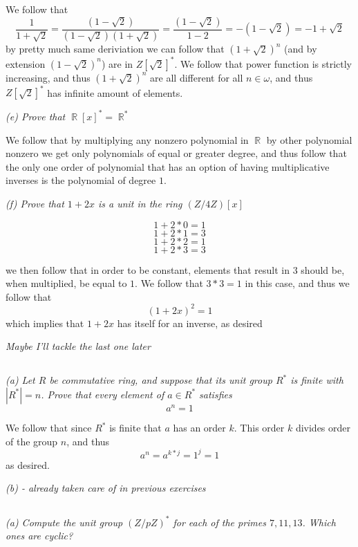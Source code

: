 \documentclass[11pt,oneside,titlepage]{book}
\DeclareMathOperator \real {\mathbb {R}}
\begin{document}
We follow that
$$\frac{1}{1 + \sqrt{2}} =
\frac{(1 - \sqrt{2})}{(1 - \sqrt{2})(1 + \sqrt{2})} = \frac{(1 -
\sqrt{2})}{1 - 2} = -(1 - \sqrt{2}) = -1 + \sqrt{2}$$ by pretty much
same deriviation we can follow that $(1 + \sqrt{2})^n$ (and by
extension $(1 - \sqrt{2})^n$) are in $Z[\sqrt{2}]^*$.  We follow that
power function is strictly increasing, and thus $(1 + \sqrt{2})^n$ are
all different for all $n \in \omega$, and thus $Z[\sqrt{2}]^*$ has
infinite amount of elements.

\textit{(e) Prove that $\real[x]^* = \real^*$}

We follow that by multiplying any nonzero polynomial in $\real$ by
other polynomial nonzero we get only polynomials of equal or greater
degree, and thus follow that the only one order of polynomial that has
an option of having multiplicative inverses is the polynomial of
degree $1$.

\textit{(f) Prove that $1 + 2x$ is a unit in the ring $(Z/4Z)[x]$ }

$$1 + 2 * 0 = 1$$
$$1 + 2 * 1 = 3$$
$$1 + 2 * 2 = 1$$
$$1 + 2 * 3 = 3$$

we then follow that in order to be constant, elements that result in
$3$ should be, when multiplied, be equal to $1$. We follow that $3 * 3
= 1$ in this case, and thus we follow that
$$(1 + 2x)^2 = 1$$
which implies that $1 + 2x$ has itself for an inverse, as desired

\textit{Maybe I'll tackle the last one later}

\subsection{}

\textit{(a) Let $R$ be commutative ring, and suppose that its unit
group $R^*$ is finite with $|R^*| = n$. Prove that every element of $a
\in R^*$ satisfies
  $$a^n = 1$$
}

We follow that since $R^*$ is finite that $a$ has an order $k$. This
order $k$ divides order of the group $n$, and thus
$$a^n = a^{k * j} = 1^j = 1$$
as desired.

\textit{(b) - already taken care of in previous exercises}

\subsection{}

\textit{(a) Compute the unit group $(Z/pZ)^*$ for each of the primes
$7, 11, 13$. Which ones are cyclic? }
\end{document}
